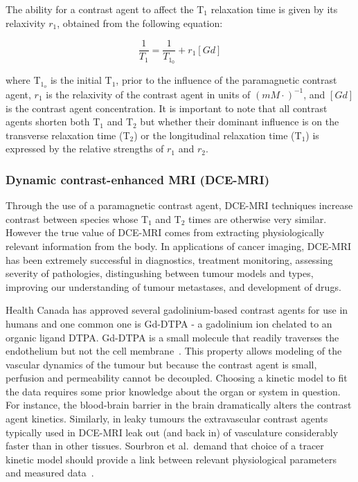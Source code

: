 The ability for a contrast agent to affect the T$_1$ relaxation time is given by its relaxivity $r_1$, obtained from the following equation:

\begin{equation}
\frac{1}{T_{1}} = \frac{1}{T_{1_0}} + r_1 [Gd]
\end{equation}

where T$_{1_o}$ is the initial T$_1$, prior to the influence of the paramagnetic contrast agent, $r_1$ is the relaxivity of the contrast agent in units of $(mM\cdot)^{-1}$, and $[Gd]$ is the contrast agent concentration.
It is important to note that all contrast agents shorten both T$_1$ and T$_2$ but whether their dominant influence is on the transverse relaxation time (T$_2$) or the longitudinal relaxation time (T$_1$) is expressed by the relative strengths of $r_1$ and $r_2$.

\subsubsection{Dynamic contrast-enhanced MRI (\acs{DCE-MRI})}

Through the use of a paramagnetic contrast agent, \acs{DCE-MRI} techniques increase contrast between species whose T$_1$ and T$_2$ times are otherwise very similar.
However the true value of \acs{DCE-MRI} comes from extracting physiologically relevant information from the body. 
In applications of cancer imaging, \acs{DCE-MRI} has been extremely successful in diagnostics, treatment monitoring, assessing severity of pathologies, distingushing between tumour models and types, improving our understanding of tumour metastases, and development of drugs.

Health Canada has approved several gadolinium-based contrast agents for use in humans and one common one is \acs{Gd-DTPA} - a gadolinium ion chelated to an organic ligand DTPA.
\acs{Gd-DTPA} is a small molecule that readily traverses the endothelium but not the cell membrane~\cite{WalkerSamuel:2006ch}. 
This property allows modeling of the vascular dynamics of the tumour but because the contrast agent is small, perfusion and permeability cannot be decoupled.
Choosing a kinetic model to fit the data requires some prior knowledge about the organ or system in question. 
For instance, the blood-brain barrier in the brain dramatically alters the contrast agent kinetics. 
Similarly, in leaky tumours the extravascular contrast agents typically used in \acs{DCE-MRI} leak out (and back in) of vasculature considerably faster than in other tissues. 
Sourbron et al.\ demand that choice of a tracer kinetic model should provide a link between relevant physiological parameters and measured data~\cite{Sourbron:2011ce}. 

